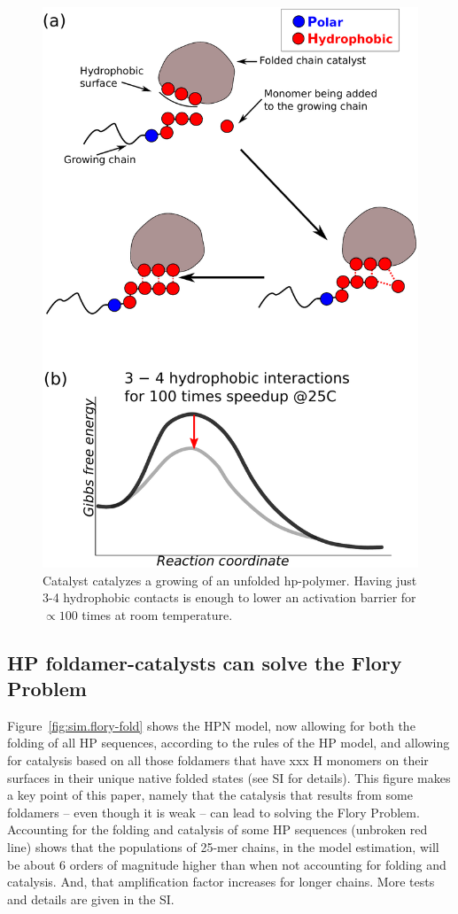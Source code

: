 \documentclass[journal=jacsat,manuscript=article,layout=twocolumn]{achemso}
\begin{document}
\begin{figure}[h!]
  \centering
  \includegraphics[width=0.9\columnwidth]{pictures/hp-catalysis.pdf} 
  \caption{Catalyst catalyzes a growing of an unfolded hp-polymer. 
           Having just 3-4 hydrophobic contacts is enough to lower an 
           activation barrier for $\propto 100$ times at room 
           temperature.}
  \label{fig:hp-catalysis}
\end{figure}


\subsection{HP foldamer-catalysts can solve the Flory Problem}

Figure~\ref{fig:sim.flory-fold} shows the HPN model, now allowing for both the folding of all HP 
sequences, according to the rules of the HP model, and allowing for catalysis based on all those 
foldamers that have xxx H monomers on their surfaces in their unique native folded states (see SI 
for details).  This figure makes a key point of this paper, namely that the catalysis that results 
from some foldamers -- even though it is weak -- can lead to solving the Flory Problem.  Accounting 
for the folding and catalysis of some HP sequences (unbroken red line) shows that the populations of 
25-mer chains, in the model estimation, will be about 6 orders of magnitude higher than when not 
accounting for folding and catalysis.  And, that amplification factor increases for longer chains.  
More tests and details are given in the SI.
\end{document}
